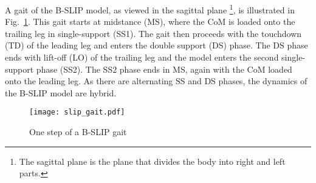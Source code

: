 A gait of the B-SLIP model, as viewed in the sagittal plane \footnote{The sagittal plane is the plane that divides the body into right and left parts.}, is illustrated in Fig.~\ref{fig:slip_gait}. This gait starts at midstance (MS), where the CoM is loaded onto the trailing leg in single-support (SS1). The gait then proceeds with the touchdown (TD) of the leading leg and enters the double support (DS) phase. The DS phase ends with lift-off (LO) of the trailing leg and the model enters the second single-support phase (SS2). The SS2 phase ends in MS, again with the CoM loaded onto the leading leg. As there are alternating SS and DS phases, the dynamics of the B-SLIP model are hybrid.

\begin{figure}
	\centering
	\texttt{[image: slip\_gait.pdf]}
	\caption{One step of a B-SLIP gait}\label{fig:slip_gait}
\end{figure} 

